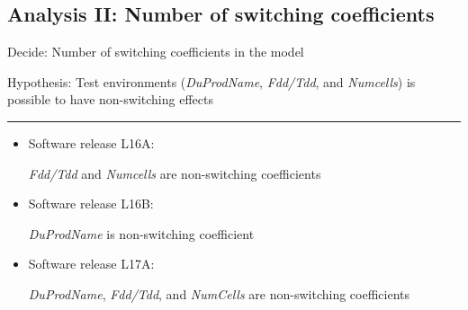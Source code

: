 \documentclass{beamer}
\begin{document}
\subsection{Analysis II: Number of switching coefficients}
\begin{frame}[fragile]
\small{Decide: Number of switching coefficients in the model

Hypothesis: Test environments (\textit{DuProdName}, \textit{Fdd/Tdd}, and \textit{Numcells}) is possible to have non-switching effects}
\rule{\textwidth}{0.4pt}

\begin{itemize}
	\item Software release L16A: 
	
	\textit{Fdd/Tdd} and \textit{Numcells} are non-switching coefficients

	\item Software release L16B: 
	
	\textit{DuProdName} is non-switching coefficient


	\item Software release L17A: 
	
	\textit{DuProdName}, \textit{Fdd/Tdd}, and \textit{NumCells} are non-switching coefficients
\end{itemize}

\end{frame}
\end{document}
